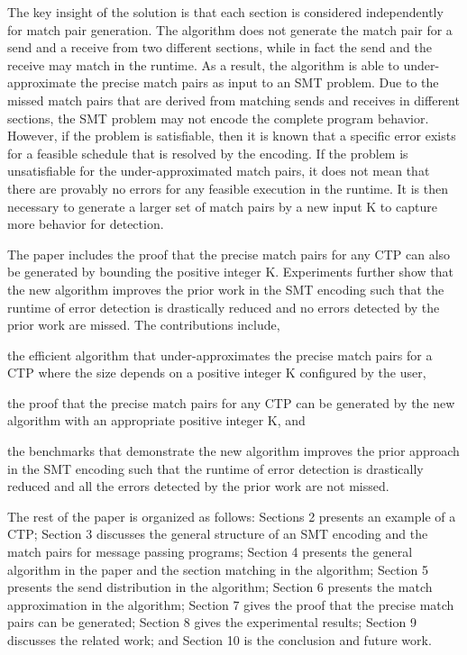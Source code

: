 The key insight of the solution is that each section is considered independently for match pair generation.  
The algorithm does not generate the match pair for a send and a receive from two different sections, while in fact the send and the receive may match in the runtime. 
As a result, the algorithm is able to under-approximate the precise match pairs as input to an SMT problem. 
Due to the missed match pairs that are derived from matching sends and receives in different sections, the SMT problem may not encode the complete program behavior. However, if the problem is satisfiable, then it is known that a specific error exists for a feasible schedule that is resolved by the encoding. If the problem is unsatisfiable for the under-approximated match pairs, it does not mean that there are provably no errors for any feasible execution in the runtime. It is then necessary to generate a larger set of match pairs by a new input K to capture more behavior for detection.


The paper includes the proof that the precise match pairs for any CTP can also be generated by bounding the positive integer K. Experiments further show that the new algorithm improves the prior work in the SMT encoding such that the runtime of error detection is drastically reduced and no errors detected by the prior work are missed.
The contributions include,
\begin{compactitem}
\item the efficient algorithm that under-approximates the precise match pairs for a CTP where the size depends on a positive integer K configured by the user,
\item the proof that the precise match pairs for any CTP can be generated by the new algorithm with an appropriate positive integer K, and
\item the benchmarks that demonstrate the new algorithm improves the prior approach in the SMT encoding such that the runtime of error detection is drastically reduced and all the errors detected by the prior work are not missed. 
\end{compactitem}

The rest of the paper is organized as follows: 
Sections 2 presents an example of a CTP; Section 3 discusses the general structure of an SMT encoding and the match pairs for message passing programs;  Section 4 presents the general algorithm in the paper and the section matching in the algorithm; Section 5 presents the send distribution in the algorithm; Section 6 presents the match approximation in the algorithm; Section 7 gives the proof that the precise match pairs can be generated; Section 8 gives the experimental results; Section 9 discusses the related work; and Section 10 is the conclusion and future work.
